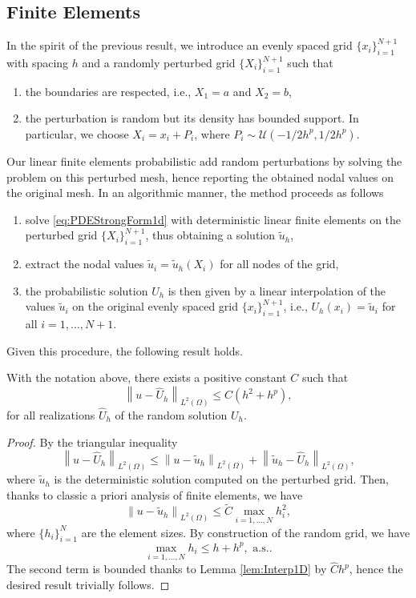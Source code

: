 \documentclass{siamart1116}
\numberwithin{theorem}{section}
\newcommand{\norm}[1]{\left\lVert#1\right\rVert}
\begin{document}
\subsection{Finite Elements} In the spirit of the previous result, we introduce an evenly spaced grid $\{x_i\}_{i=1}^{N+1}$ with spacing $h$ and a randomly perturbed grid $\{X_i\}_{i=1}^{N+1}$ such that
\begin{enumerate}
	\item the boundaries are respected, i.e., $X_1 = a$ and $X_2 = b$,
	\item the perturbation is random but its density has bounded support. In particular, we choose $X_i = x_i + P_i$, where $P_i \sim \mathcal{U} (-1/2 h^{p}, 1/2 h^p)$.
\end{enumerate}
Our linear finite elements probabilistic add random perturbations by solving the problem on this perturbed mesh, hence reporting the obtained nodal values on the original mesh. In an algorithmic manner, the method proceeds as follows
\begin{enumerate}
	\item solve \eqref{eq:PDEStrongForm1d} with deterministic linear finite elements on the perturbed grid $\{X_i\}_{i=1}^{N+1}$, thus obtaining a solution $\tilde u_h$,
	\item extract the nodal values $\tilde u_i = \tilde u_h(X_i)$ for all nodes of the grid,
	\item the probabilistic solution $U_h$ is then given by a linear interpolation of the values $\tilde u_i$ on the original evenly spaced grid $\{x_i\}_{i=1}^{N+1}$, i.e., $U_h(x_i) = \tilde u_i$ for all $i = 1, \ldots, N+1$.
\end{enumerate} 
Given this procedure, the following result holds.
\begin{theorem}\label{thm:Convergence} With the notation above, there exists a positive constant $C$ such that 
	\begin{equation}
		\norm{u - \hat U_h}_{L^2(\Omega)} \leq C(h^2 + h^p),
	\end{equation}
	for all realizations $\hat U_h$ of the random solution $U_h$.
\end{theorem}
\begin{proof} By the triangular inequality 
	\begin{equation}
		\norm{u - \hat U_h}_{L^2(\Omega)} \leq \norm{u - \tilde u_h}_{L^2(\Omega)} + \norm{\tilde u_h - \hat U_h}_{L^2(\Omega)},
	\end{equation}
	where $\tilde u_h$ is the deterministic solution computed on the perturbed grid. Then, thanks to classic a priori analysis of finite elements, we have
	\begin{equation}
		\norm{u - \tilde u_h}_{L^2(\Omega)} \leq \tilde C \max_{i=1,\ldots, N} h_i^2,
	\end{equation}
	where $\{h_i\}_{i=1}^{N}$ are the element sizes. By construction of the random grid, we have
	\begin{equation}
		\max_{i=1,\ldots, N} h_i \leq h + h^p, \text{ a.s.}.
	\end{equation}
	The second term is bounded thanks to Lemma \ref{lem:Interp1D} by $\hat C h^p$, hence the desired result trivially follows.
\end{proof}
\end{document}
